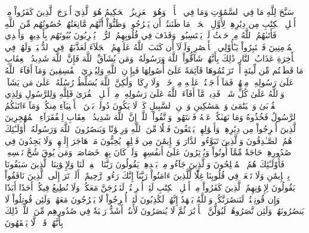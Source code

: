 سَبَّحَ لِلَّهِ مَا فِي ٱلسَّمَٰوَٰتِ وَمَا فِي ٱلۡأَرۡضِۖ وَهُوَ ٱلۡعَزِيزُ ٱلۡحَكِيمُ
هُوَ ٱلَّذِيٓ أَخۡرَجَ ٱلَّذِينَ كَفَرُواْ مِنۡ أَهۡلِ ٱلۡكِتَٰبِ مِن دِيَٰرِهِمۡ لِأَوَّلِ ٱلۡحَشۡرِۚ مَا ظَنَنتُمۡ أَن يَخۡرُجُواْۖ وَظَنُّوٓاْ أَنَّهُم مَّانِعَتُهُمۡ حُصُونُهُم مِّنَ ٱللَّهِ فَأَتَىٰهُمُ ٱللَّهُ مِنۡ حَيۡثُ لَمۡ يَحۡتَسِبُواْۖ وَقَذَفَ فِي قُلُوبِهِمُ ٱلرُّعۡبَۚ يُخۡرِبُونَ بُيُوتَهُم بِأَيۡدِيهِمۡ وَأَيۡدِي ٱلۡمُؤۡمِنِينَ فَٱعۡتَبِرُواْ يَـٰٓأُوْلِي ٱلۡأَبۡصَٰرِ
وَلَوۡلَآ أَن كَتَبَ ٱللَّهُ عَلَيۡهِمُ ٱلۡجَلَآءَ لَعَذَّبَهُمۡ فِي ٱلدُّنۡيَاۖ وَلَهُمۡ فِي ٱلۡأٓخِرَةِ عَذَابُ ٱلنَّارِ
ذَٰلِكَ بِأَنَّهُمۡ شَآقُّواْ ٱللَّهَ وَرَسُولَهُۥۖ وَمَن يُشَآقِّ ٱللَّهَ فَإِنَّ ٱللَّهَ شَدِيدُ ٱلۡعِقَابِ
مَا قَطَعۡتُم مِّن لِّينَةٍ أَوۡ تَرَكۡتُمُوهَا قَآئِمَةً عَلَىٰٓ أُصُولِهَا فَبِإِذۡنِ ٱللَّهِ وَلِيُخۡزِيَ ٱلۡفَٰسِقِينَ
وَمَآ أَفَآءَ ٱللَّهُ عَلَىٰ رَسُولِهِۦ مِنۡهُمۡ فَمَآ أَوۡجَفۡتُمۡ عَلَيۡهِ مِنۡ خَيۡلٖ وَلَا رِكَابٖ وَلَٰكِنَّ ٱللَّهَ يُسَلِّطُ رُسُلَهُۥ عَلَىٰ مَن يَشَآءُۚ وَٱللَّهُ عَلَىٰ كُلِّ شَيۡءٖ قَدِيرٞ
مَّآ أَفَآءَ ٱللَّهُ عَلَىٰ رَسُولِهِۦ مِنۡ أَهۡلِ ٱلۡقُرَىٰ فَلِلَّهِ وَلِلرَّسُولِ وَلِذِي ٱلۡقُرۡبَىٰ وَٱلۡيَتَٰمَىٰ وَٱلۡمَسَٰكِينِ وَٱبۡنِ ٱلسَّبِيلِ كَيۡ لَا يَكُونَ دُولَةَۢ بَيۡنَ ٱلۡأَغۡنِيَآءِ مِنكُمۡۚ وَمَآ ءَاتَىٰكُمُ ٱلرَّسُولُ فَخُذُوهُ وَمَا نَهَىٰكُمۡ عَنۡهُ فَٱنتَهُواْۚ وَٱتَّقُواْ ٱللَّهَۖ إِنَّ ٱللَّهَ شَدِيدُ ٱلۡعِقَابِ
لِلۡفُقَرَآءِ ٱلۡمُهَٰجِرِينَ ٱلَّذِينَ أُخۡرِجُواْ مِن دِيَٰرِهِمۡ وَأَمۡوَٰلِهِمۡ يَبۡتَغُونَ فَضۡلٗا مِّنَ ٱللَّهِ وَرِضۡوَٰنٗا وَيَنصُرُونَ ٱللَّهَ وَرَسُولَهُۥٓۚ أُوْلَـٰٓئِكَ هُمُ ٱلصَّـٰدِقُونَ
وَٱلَّذِينَ تَبَوَّءُو ٱلدَّارَ وَٱلۡإِيمَٰنَ مِن قَبۡلِهِمۡ يُحِبُّونَ مَنۡ هَاجَرَ إِلَيۡهِمۡ وَلَا يَجِدُونَ فِي صُدُورِهِمۡ حَاجَةٗ مِّمَّآ أُوتُواْ وَيُؤۡثِرُونَ عَلَىٰٓ أَنفُسِهِمۡ وَلَوۡ كَانَ بِهِمۡ خَصَاصَةٞۚ وَمَن يُوقَ شُحَّ نَفۡسِهِۦ فَأُوْلَـٰٓئِكَ هُمُ ٱلۡمُفۡلِحُونَ
وَٱلَّذِينَ جَآءُو مِنۢ بَعۡدِهِمۡ يَقُولُونَ رَبَّنَا ٱغۡفِرۡ لَنَا وَلِإِخۡوَٰنِنَا ٱلَّذِينَ سَبَقُونَا بِٱلۡإِيمَٰنِ وَلَا تَجۡعَلۡ فِي قُلُوبِنَا غِلّٗا لِّلَّذِينَ ءَامَنُواْ رَبَّنَآ إِنَّكَ رَءُوفٞ رَّحِيمٌ
۞أَلَمۡ تَرَ إِلَى ٱلَّذِينَ نَافَقُواْ يَقُولُونَ لِإِخۡوَٰنِهِمُ ٱلَّذِينَ كَفَرُواْ مِنۡ أَهۡلِ ٱلۡكِتَٰبِ لَئِنۡ أُخۡرِجۡتُمۡ لَنَخۡرُجَنَّ مَعَكُمۡ وَلَا نُطِيعُ فِيكُمۡ أَحَدًا أَبَدٗا وَإِن قُوتِلۡتُمۡ لَنَنصُرَنَّكُمۡ وَٱللَّهُ يَشۡهَدُ إِنَّهُمۡ لَكَٰذِبُونَ
لَئِنۡ أُخۡرِجُواْ لَا يَخۡرُجُونَ مَعَهُمۡ وَلَئِن قُوتِلُواْ لَا يَنصُرُونَهُمۡ وَلَئِن نَّصَرُوهُمۡ لَيُوَلُّنَّ ٱلۡأَدۡبَٰرَ ثُمَّ لَا يُنصَرُونَ
لَأَنتُمۡ أَشَدُّ رَهۡبَةٗ فِي صُدُورِهِم مِّنَ ٱللَّهِۚ ذَٰلِكَ بِأَنَّهُمۡ قَوۡمٞ لَّا يَفۡقَهُونَ
